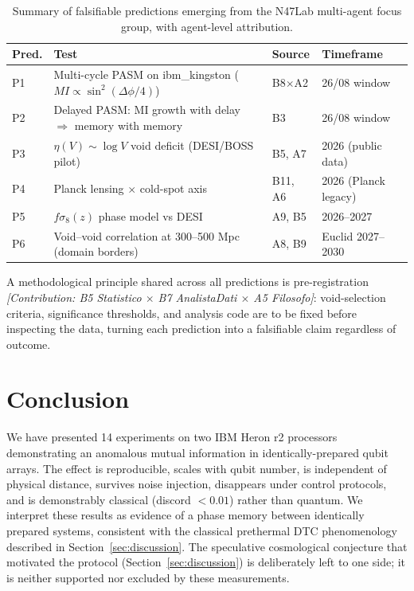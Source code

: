 \documentclass[12pt,a4paper]{article}
\begin{document}
\begin{table}[h]
\centering
\small
\begin{tabular}{p{}p{}p{}p{}}
\toprule
\textbf{Pred.} & \textbf{Test} & \textbf{Source} & \textbf{Timeframe} \\
\midrule
P1 & Multi-cycle PASM on ibm\_kingston ($MI \propto \sin^2(\Delta\phi/4)$) & B8$\times$A2 & 26/08 window \\
P2 & Delayed PASM: MI growth with delay $\Rightarrow$ memory with memory & B3 & 26/08 window \\
P3 & $\eta(V) \sim \log V$ void deficit (DESI/BOSS pilot) & B5, A7 & 2026 (public data) \\
P4 & Planck lensing $\times$ cold-spot axis & B11, A6 & 2026 (Planck legacy) \\
P5 & $f\sigma_8(z)$ phase model vs DESI & A9, B5 & 2026--2027 \\
P6 & Void--void correlation at 300--500 Mpc (domain borders) & A8, B9 & Euclid 2027--2030 \\
\bottomrule
\end{tabular}
\caption{Summary of falsifiable predictions emerging from the N47Lab multi-agent focus group, with agent-level attribution.}
\label{tab:predictions}
\end{table}

A methodological principle shared across all predictions is pre-registration \textit{[Contribution: B5 Statistico $\times$ B7 AnalistaDati $\times$ A5 Filosofo]}: void-selection criteria, significance thresholds, and analysis code are to be fixed before inspecting the data, turning each prediction into a falsifiable claim regardless of outcome.

\section{Conclusion}
\label{sec:conclusion}

We have presented 14 experiments on two IBM Heron r2 processors demonstrating an anomalous mutual information in identically-prepared qubit arrays. The effect is reproducible, scales with qubit number, is independent of physical distance, survives noise injection, disappears under control protocols, and is demonstrably classical (discord $< 0.01$) rather than quantum. We interpret these results as evidence of a phase memory between identically prepared systems, consistent with the classical prethermal DTC phenomenology described in Section~\ref{sec:discussion}. The speculative cosmological conjecture that motivated the protocol (Section~\ref{sec:discussion}) is deliberately left to one side; it is neither supported nor excluded by these measurements.
\end{document}
